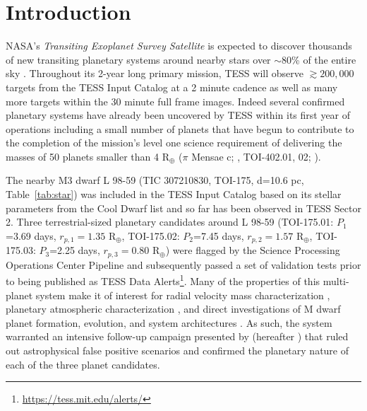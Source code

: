 \documentclass[longauth]{aa}
\begin{document}
\section{Introduction}
NASA's \emph{Transiting Exoplanet Survey Satellite} \citep[TESS;][]{ricker15} is expected to discover thousands of new transiting planetary systems around nearby stars over $\sim 80$\% of the entire sky \citep{sullivan15,ballard19,barclay18,huang18b}. Throughout its 2-year long primary mission, TESS will observe $\gtrsim 200,000$ targets from the TESS Input Catalog \citep[TIC;][]{stassun17} at a 2 minute cadence as well as many more targets within the 30 minute full frame images. Indeed several confirmed planetary systems have already been uncovered by TESS within its first year of operations \citep{brahm18,jones18,canas19,dragomir19,espinoza19,kipping19,kostov19,neilsen19,quinn19,rodriguez19,wang19,vanderspek19} including a small number of planets that have begun to contribute to the completion of the mission's level one science requirement of delivering the masses of 50 planets smaller than 4 R$_{\oplus}$ ($\pi$ Mensae c; \citealt{gandolfi18,huang18a}, TOI-402.01, 02; \citealt{dumusque19}).

The nearby M3 dwarf L 98-59 (TIC 307210830, TOI-175, d=10.6 pc, Table~\ref{tab:star}) was included in the TESS Input Catalog based on its stellar parameters from the Cool Dwarf list \citep{muirhead18} and so far has been observed in TESS Sector 2. Three terrestrial-sized planetary candidates around L 98-59 (TOI-175.01: $P_1$=3.69 days, $r_{p,1}=1.35$ R$_{\oplus}$, TOI-175.02: $P_2$=7.45 days, $r_{p,2}=1.57$ R$_{\oplus}$, TOI-175.03: $P_3$=2.25 days, $r_{p,3}=0.80$ R$_{\oplus}$) were flagged by the Science Processing Operations Center Pipeline \citep[SPOC;][]{jenkins16} and subsequently passed a set of validation tests \citep{twicken18,li19} prior to being published as TESS Data Alerts\footnote{\url{https://tess.mit.edu/alerts/}}. Many of the properties of this multi-planet system make it of interest for radial velocity mass characterization \citep{cloutier18b}, planetary atmospheric characterization \citep{kempton18,louie18}, and direct investigations of M dwarf planet formation, evolution, and system architectures \citep{lissauer11,fabrycky14}. As such, the system warranted an intensive follow-up campaign presented by  \citealt{kostov19} (hereafter ) that ruled out astrophysical false positive scenarios and confirmed the planetary nature of each of the three planet candidates. 
\end{document}
